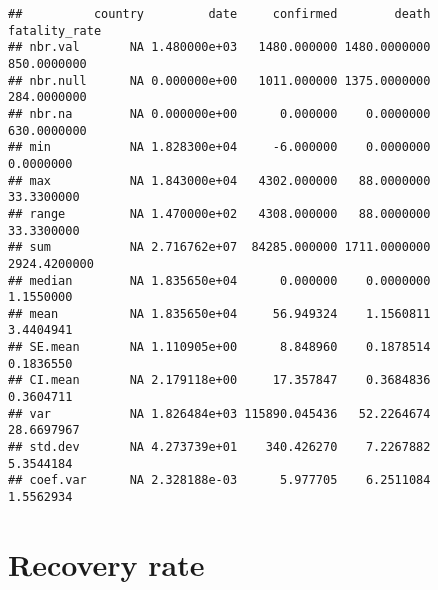 \documentclass[
]{article}
\begin{document}
\begin{verbatim}
##          country         date     confirmed        death fatality_rate
## nbr.val       NA 1.480000e+03   1480.000000 1480.0000000   850.0000000
## nbr.null      NA 0.000000e+00   1011.000000 1375.0000000   284.0000000
## nbr.na        NA 0.000000e+00      0.000000    0.0000000   630.0000000
## min           NA 1.828300e+04     -6.000000    0.0000000     0.0000000
## max           NA 1.843000e+04   4302.000000   88.0000000    33.3300000
## range         NA 1.470000e+02   4308.000000   88.0000000    33.3300000
## sum           NA 2.716762e+07  84285.000000 1711.0000000  2924.4200000
## median        NA 1.835650e+04      0.000000    0.0000000     1.1550000
## mean          NA 1.835650e+04     56.949324    1.1560811     3.4404941
## SE.mean       NA 1.110905e+00      8.848960    0.1878514     0.1836550
## CI.mean       NA 2.179118e+00     17.357847    0.3684836     0.3604711
## var           NA 1.826484e+03 115890.045436   52.2264674    28.6697967
## std.dev       NA 4.273739e+01    340.426270    7.2267882     5.3544184
## coef.var      NA 2.328188e-03      5.977705    6.2511084     1.5562934
\end{verbatim}

\hypertarget{recovery-rate}{%
\section{Recovery rate}\label{recovery-rate}}
\end{document}
